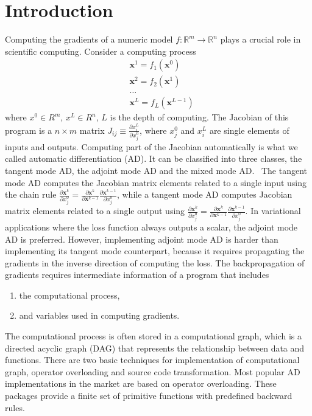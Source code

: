 \documentclass[aps,twocolumn,longbibliography,english,superscriptaddress]{revtex4-1}
\newcommand{\<}{\langle}
\renewcommand{\>}{\rangle}
\newcommand{\vx}{{\mathbf{x}}}
\theoremstyle{definition}\newtheorem{definition}{\textit{Definition}}
\begin{document}
\section{Introduction}\label{sec:intro}
    Computing the gradients of a numeric model $f : \mathbb{R}^m \rightarrow \mathbb{R}^n$ plays a crucial role in scientific computing. Consider a computing process
\begin{align*}
    &\vx^1 = f_1(\vx^0)\\
    &\vx^2 = f_2(\vx^1)\\
    &\ldots\\
    &\vx^L = f_L(\vx^{L-1})
\end{align*}
where $x^0\in R^m$, $x^L\in R^n$, $L$ is the depth of computing.
The Jacobian of this program is a $n\times m$ matrix $J_{ij} \equiv \frac{\partial x^L_i}{\partial x_j^0}$, where $x_j^0$ and $x_i^L$ are single elements of inputs and outputs.
Computing part of the Jacobian automatically is what we called automatic differentiation (AD). It can be classified into three classes, the tangent mode AD, the adjoint mode AD and the mixed mode AD.~\cite{Hascoet2013}
The tangent mode AD computes the Jacobian matrix elements related to a single input using the chain rule $\frac{\partial \vx^k}{\partial x^0_j} = \frac{\partial \vx^k}{\partial \vx^{k-1}}\frac{\partial \vx^{k-1}}{\partial x^0_j}$, while a tangent mode AD computes Jacobian matrix elements related to a single output using $\frac{\partial \vx^k}{\partial x^0_j} = \frac{\partial \vx^k}{\partial \vx^{k-1}}\frac{\partial \vx^{k-1}}{\partial x^0_j}$.
    In variational applications where the loss function always outputs a scalar, the adjoint mode AD is preferred.
However, implementing adjoint mode AD is harder than implementing its tangent mode counterpart, because it requires propagating the gradients in the inverse direction of computing the loss. The backpropagation of gradients requires intermediate information of a program that includes
\begin{enumerate}
    \item the computational process,
    \item and variables used in computing gradients.
\end{enumerate}
    The computational process is often stored in a computational graph, which is a directed acyclic graph (DAG) that represents the relationship between data and functions.
    There are two basic techniques for implementation of computational graph, operator overloading and source code transformation.
    Most popular AD implementations in the market are based on operator overloading. These packages provide a finite set of primitive functions with predefined backward rules.
\end{document}
